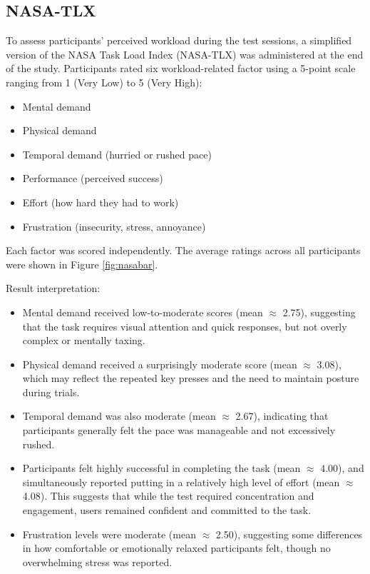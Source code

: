 \documentclass{l4proj}
\begin{document}
\newpage

\subsection{NASA-TLX} 
To assess participants' perceived workload during the test sessions, a simplified version of the NASA Task Load Index (NASA-TLX) was administered at the end of the study. Participants rated six workload-related factor using a 5-point scale ranging from 1 (Very Low) to 5 (Very High):

\begin{itemize}
    \item Mental demand
    \item Physical demand
    \item Temporal demand (hurried or rushed pace)
    \item Performance (perceived success)
    \item Effort (how hard they had to work)
    \item Frustration (insecurity, stress, annoyance)
\end{itemize}

Each factor was scored independently. The average ratings across all participants were shown in Figure \ref{fig:nasabar}.

Result interpretation:
\begin{itemize}
    \item Mental demand received low-to-moderate scores (mean $\approx$ 2.75), suggesting that the task requires visual attention and quick responses, but not overly complex or mentally taxing.
    \item Physical demand received a surprisingly moderate score (mean $\approx$ 3.08), which may reflect the repeated key presses and the need to maintain posture during trials.
    \item Temporal demand was also moderate (mean $\approx$ 2.67), indicating that participants generally felt the pace was manageable and not excessively rushed.
    \item Participants felt highly successful in completing the task (mean $\approx$ 4.00), and simultaneously reported putting in a relatively high level of effort (mean $\approx$ 4.08). This suggests that while the test required concentration and engagement, users remained confident and committed to the task.
    \item Frustration levels were moderate (mean $\approx$ 2.50), suggesting some differences in how comfortable or emotionally relaxed participants felt, though no overwhelming stress was reported.
\end{itemize}
\end{document}
